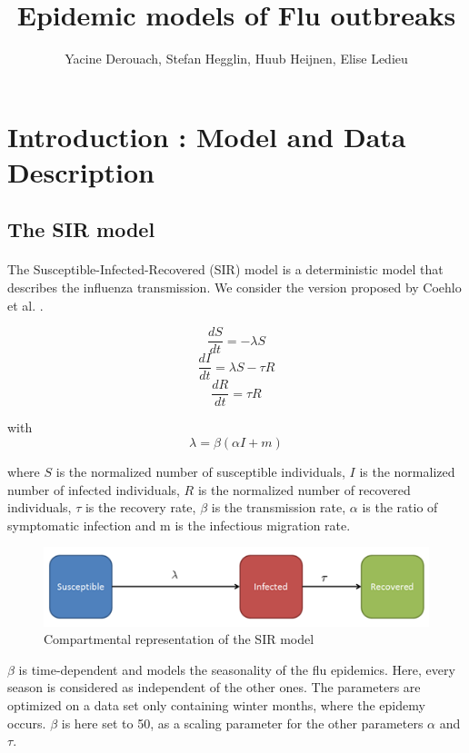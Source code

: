 \documentclass[11pt, a4paper]{article}
\author{Yacine Derouach, Stefan Hegglin, Huub Heijnen, Elise Ledieu}
\title{Epidemic models of Flu outbreaks}
\begin{document}
\maketitle

\section{Introduction : Model and Data Description}
\label{sec:intro}
\subsection{The SIR model}
\label{sec:SIR}
\paragraph{}
The Susceptible-Infected-Recovered (SIR) model is a deterministic model that describes the influenza transmission. We consider the version proposed by Coehlo et al. \cite{coelho2011bayesian}.

\begin{equation}
\frac{dS}{dt} = - \lambda S
\end{equation}
\begin{equation}
\frac{dI}{dt} = \lambda S - \tau R
\end{equation}
\begin{equation}
\frac{dR}{dt} = \tau R
\end{equation}

with \[ \lambda = \beta (\alpha I + m) \]

where $S$ is the normalized number of susceptible individuals, $I$ is the normalized number of infected individuals, $R$ is the normalized number of recovered individuals, $\tau $ is the recovery rate, $\beta $ is the transmission rate, $\alpha$ is the ratio of symptomatic infection and m is the infectious migration rate.

\begin{figure}[h]
\FloatBarrier
\center
   \includegraphics[width = \textwidth]{figures/picture1.png}
   \caption{Compartmental representation of the SIR model}
   \label{SIRcr}
\end{figure}

$\beta$ is time-dependent and models the seasonality of the flu epidemics. Here, every season is considered as independent of the other ones. The parameters are optimized on a data set only containing winter months, where the epidemy occurs. $\beta$ is here set to 50, as a scaling parameter for the other parameters $\alpha$ and $\tau$.
\end{document}
